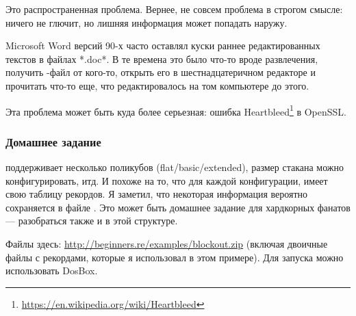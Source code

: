 Это распространенная проблема.
Вернее, не совсем проблема в строгом смысле: ничего не глючит, но лишняя информация может попадать наружу.

Microsoft Word версий 90-х часто оставлял куски раннее редактированных текстов в файлах *.doc*.
В те времена это было что-то вроде развлечения, получить -файл от кого-то, открыть его в шестнадцатеричном редакторе
и прочитать что-то еще, что редактировалось на том компьютере до этого.

Эта проблема может быть куда более серьезная: ошибка Heartbleed\footnote{\url{https://en.wikipedia.org/wiki/Heartbleed}}
в OpenSSL.

\subsubsection{Домашнее задание}

 поддерживает несколько поликубов (flat/basic/extended), размер стакана можно конфигурировать, итд.
И похоже на то, что для каждой конфигурации,  имеет свою таблицу рекордов.
Я заметил, что некоторая информация вероятно сохраняется в файле .
Это может быть домашнее задание для хардкорных фанатов  --- разобраться также и в этой структуре.

Файлы  здесь: \url{http://beginners.re/examples/blockout.zip}
(включая двоичные файлы с рекордами, которые я использовал в этом примере).
Для запуска можно использовать DosBox.

